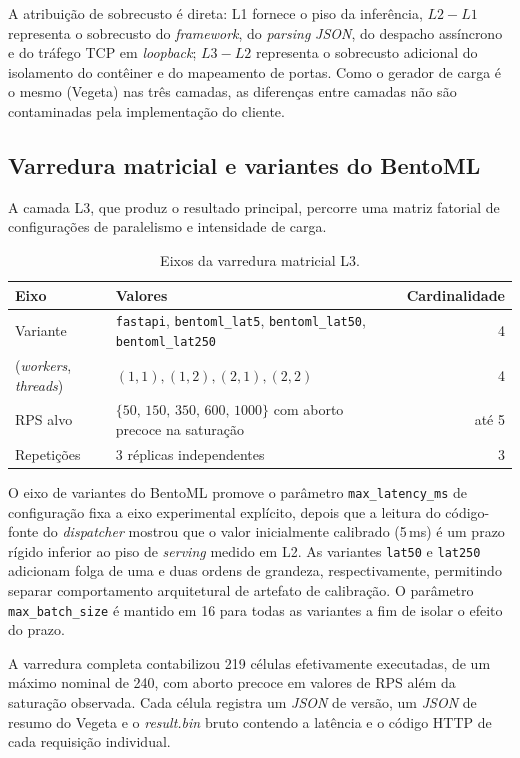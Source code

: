 A atribuição de sobrecusto é direta: L1 fornece o piso da inferência, $L2 -
L1$ representa o sobrecusto do \textit{framework}, do \textit{parsing}
\textit{JSON}, do despacho assíncrono e do tráfego TCP em \textit{loopback};
$L3 - L2$ representa o sobrecusto adicional do isolamento do contêiner e do
mapeamento de portas. Como o gerador de carga é o mesmo (Vegeta) nas três
camadas, as diferenças entre camadas não são contaminadas pela
implementação do cliente.

\subsection{Varredura matricial e variantes do BentoML}

A camada L3, que produz o resultado principal, percorre uma matriz
fatorial de configurações de paralelismo e intensidade de carga.

\begin{table}[H]
\centering
\caption{Eixos da varredura matricial L3.}
\label{tab:matrix}
\begin{tabularx}{\textwidth}{l X r}
\toprule
Eixo & Valores & Cardinalidade \\
\midrule
Variante & \texttt{fastapi}, \texttt{bentoml\_lat5}, \texttt{bentoml\_lat50}, \texttt{bentoml\_lat250} & 4 \\
(\textit{workers}, \textit{threads}) & $(1,1), (1,2), (2,1), (2,2)$ & 4 \\
RPS alvo & $\{50,\,150,\,350,\,600,\,1000\}$ com aborto precoce na saturação & até 5 \\
Repetições & 3 réplicas independentes & 3 \\
\bottomrule
\end{tabularx}
\end{table}

O eixo de variantes do BentoML promove o parâmetro \texttt{max\_latency\_ms}
de configuração fixa a eixo experimental explícito, depois que a leitura do
código-fonte do \textit{dispatcher} \cite{bentoml_dispatcher} mostrou que o
valor inicialmente calibrado (5\,ms) é um prazo rígido inferior ao piso de
\textit{serving} medido em L2. As variantes \texttt{lat50} e \texttt{lat250}
adicionam folga de uma e duas ordens de grandeza, respectivamente, permitindo
separar comportamento arquitetural de artefato de calibração. O parâmetro
\texttt{max\_batch\_size} é mantido em 16 para todas as variantes a fim de
isolar o efeito do prazo.

A varredura completa contabilizou 219 células efetivamente executadas, de
um máximo nominal de 240, com aborto precoce em valores de RPS além da
saturação observada. Cada célula registra um \textit{JSON} de versão, um
\textit{JSON} de resumo do Vegeta e o \textit{result.bin} bruto contendo a
latência e o código HTTP de cada requisição individual.

